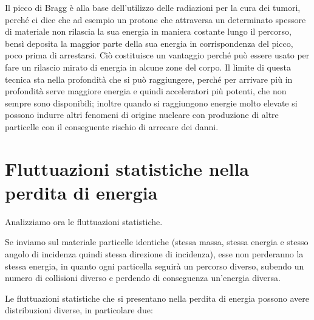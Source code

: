 Il picco di Bragg è alla base dell'utilizzo delle radiazioni per la cura dei tumori, perché ci dice che ad esempio un protone che attraversa un determinato spessore di materiale non rilascia la sua energia in maniera costante lungo il percorso, bensì deposita la maggior parte della sua energia in corrispondenza del picco, poco prima di arrestarsi. Ciò costituisce un vantaggio perché può essere usato per fare un rilascio mirato di energia in alcune zone del corpo. Il limite di questa tecnica sta nella profondità che si può raggiungere, perché per arrivare più in profondità serve maggiore energia e quindi acceleratori più potenti, che non sempre sono disponibili; inoltre quando si raggiungono energie molto elevate si possono indurre altri fenomeni di origine nucleare con produzione di altre particelle con il conseguente rischio di arrecare dei danni.

\section{Fluttuazioni statistiche nella perdita di energia}

Analizziamo ora le fluttuazioni statistiche.

Se inviamo sul materiale particelle identiche (stessa massa, stessa energia e stesso angolo di incidenza quindi stessa direzione di incidenza), esse non perderanno la stessa energia, in quanto ogni particella seguirà un percorso diverso, subendo un numero di collisioni diverso e perdendo di conseguenza un'energia diversa.

Le fluttuazioni statistiche che si presentano nella perdita di energia possono avere distribuzioni diverse, in particolare due:


